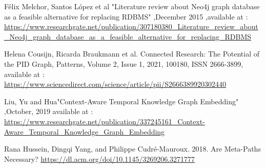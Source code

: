 \documentclass[conference]{IEEEtran}
\begin{document}
\begin{thebibliography}{00}
Félix Melchor, Santos López et al "Literature review about Neo4j graph database as a feasible alternative for replacing RDBMS" ,December 2015 ,available at : \url{https://www.researchgate.net/publication/307180380_Literature_review_about_Neo4j_graph_database_as_a_feasible_alternative_for_replacing_RDBMS}

 Helena Cousijn, Ricarda Braukmann et al.
Connected Research: The Potential of the PID Graph,
Patterns,
Volume 2, Issue 1,
2021,
100180,
ISSN 2666-3899,
available at : \url{https://www.sciencedirect.com/science/article/pii/S2666389920302440}

Liu, Yu and Hua"Context-Aware Temporal Knowledge Graph Embedding" ,October, 2019
available at : \url{https://www.researchgate.net/publication/337245161_Context-Aware_Temporal_Knowledge_Graph_Embedding}

Rana Hussein, Dingqi Yang, and Philippe Cudré-Mauroux. 2018. Are Meta-Paths Necessary? \url{https://dl.acm.org/doi/10.1145/3269206.3271777}

\end{thebibliography}
\end{document}
